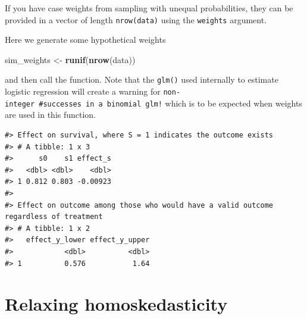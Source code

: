 \documentclass[
]{book}
\newenvironment{Shaded}{\begin{snugshade}}{\end{snugshade}}
\newcommand{\AttributeTok}[1]{\textcolor[rgb]{0.13,0.29,0.53}{#1}}
\newcommand{\CommentTok}[1]{\textcolor[rgb]{0.56,0.35,0.01}{\textit{#1}}}
\newcommand{\FunctionTok}[1]{\textcolor[rgb]{0.13,0.29,0.53}{\textbf{#1}}}
\newcommand{\NormalTok}[1]{#1}
\newcommand{\OtherTok}[1]{\textcolor[rgb]{0.56,0.35,0.01}{#1}}
\newcommand{\SpecialCharTok}[1]{\textcolor[rgb]{0.81,0.36,0.00}{\textbf{#1}}}
\newcommand{\StringTok}[1]{\textcolor[rgb]{0.31,0.60,0.02}{#1}}
\begin{document}
If you have case weights from sampling with unequal probabilities, they can be provided in a vector of length \texttt{nrow(data)} using the \texttt{weights} argument.

Here we generate some hypothetical weights

\begin{Shaded}
\begin{Highlighting}[]
\NormalTok{sim\_weights }\OtherTok{\textless{}{-}} \FunctionTok{runif}\NormalTok{(}\FunctionTok{nrow}\NormalTok{(data))}
\end{Highlighting}
\end{Shaded}

and then call the function. Note that the \texttt{glm()} used internally to estimate logistic regression will create a warning for \texttt{non-integer\ \#successes\ in\ a\ binomial\ glm!} which is to be expected when weights are used in this function.

\begin{Shaded}
\end{Shaded}

\begin{verbatim}
#> Effect on survival, where S = 1 indicates the outcome exists
#> # A tibble: 1 x 3
#>      s0    s1 effect_s
#>   <dbl> <dbl>    <dbl>
#> 1 0.812 0.803 -0.00923
#> 
#> Effect on outcome among those who would have a valid outcome regardless of treatment
#> # A tibble: 1 x 2
#>   effect_y_lower effect_y_upper
#>            <dbl>          <dbl>
#> 1          0.576           1.64
\end{verbatim}

\chapter{Relaxing homoskedasticity}\label{relaxing-homoskedasticity}
\end{document}
